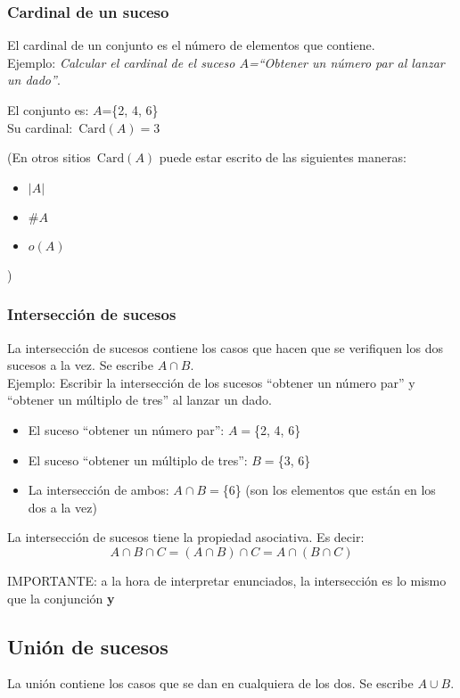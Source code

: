 \documentclass[a4paper,10pt,answers]{exam}
\newcommand{\Card}{\,\mathrm{Card}}
\begin{document}
\subsubsection{Cardinal de un suceso}
El cardinal de un conjunto es el número de elementos que contiene.\\

Ejemplo: \emph{Calcular el cardinal de el suceso $A$=``Obtener un número par al lanzar un dado''}.
\begin{center}
El conjunto es: $A$=\{2, 4, 6\}\\
Su cardinal: $\Card (A) = 3$
\end{center}
(En otros sitios $\Card(A)$ puede estar escrito de las siguientes maneras:
\begin{itemize}
	\item $|A|$
	\item $\#A$
	\item $o(A)$
\end{itemize})

\subsubsection{Intersección de sucesos}
La intersección de sucesos contiene los casos que hacen que se verifiquen los dos sucesos a la vez. Se escribe $A \cap B$.\\

Ejemplo: Escribir la intersección de los sucesos ``obtener un número par'' y ``obtener un múltiplo de tres'' al lanzar un dado.
\begin{itemize}
	\item El suceso ``obtener un número par'': $A=$\{2, 4, 6\}
	\item El suceso ``obtener un múltiplo de tres'': $B=$\{3, 6\}
	\item La intersección de ambos: $A \cap B=$\{6\} (son los elementos que están en los dos a la vez)
\end{itemize}

La intersección de sucesos tiene la propiedad asociativa. Es decir:
\[A \cap B \cap C = (A \cap B) \cap C = A \cap (B \cap C)\]

{\Large IMPORTANTE: a la hora de interpretar enunciados, la intersección es lo mismo que la conjunción \textbf{y}}
\subsection{Unión de sucesos}
La unión contiene los casos que se dan en cualquiera de los dos. Se escribe $A \cup B$.\\
\end{document}
